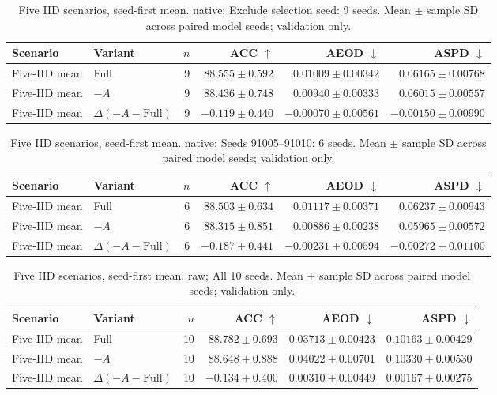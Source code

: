 \begin{table}[t]
\centering
\small
\caption{Five IID scenarios, seed-first mean. native; Exclude selection seed: 9 seeds. Mean $\pm$ sample SD across paired model seeds; validation only.}
\begin{tabular}{llrrrr}
\toprule
Scenario & Variant & $n$ & ACC $\uparrow$ & AEOD $\downarrow$ & ASPD $\downarrow$ \\
\midrule
Five-IID mean & Full & 9 & $88.555 \pm 0.592$ & $0.01009 \pm 0.00342$ & $0.06165 \pm 0.00768$ \\
Five-IID mean & $-A$ & 9 & $88.436 \pm 0.748$ & $0.00940 \pm 0.00333$ & $0.06015 \pm 0.00557$ \\
Five-IID mean & $\Delta(-A-\mathrm{Full})$ & 9 & $-0.119 \pm 0.440$ & $-0.00070 \pm 0.00561$ & $-0.00150 \pm 0.00990$ \\
\bottomrule
\end{tabular}
\end{table}

\begin{table}[t]
\centering
\small
\caption{Five IID scenarios, seed-first mean. native; Seeds 91005–91010: 6 seeds. Mean $\pm$ sample SD across paired model seeds; validation only.}
\begin{tabular}{llrrrr}
\toprule
Scenario & Variant & $n$ & ACC $\uparrow$ & AEOD $\downarrow$ & ASPD $\downarrow$ \\
\midrule
Five-IID mean & Full & 6 & $88.503 \pm 0.634$ & $0.01117 \pm 0.00371$ & $0.06237 \pm 0.00943$ \\
Five-IID mean & $-A$ & 6 & $88.315 \pm 0.851$ & $0.00886 \pm 0.00238$ & $0.05965 \pm 0.00572$ \\
Five-IID mean & $\Delta(-A-\mathrm{Full})$ & 6 & $-0.187 \pm 0.441$ & $-0.00231 \pm 0.00594$ & $-0.00272 \pm 0.01100$ \\
\bottomrule
\end{tabular}
\end{table}

\begin{table}[t]
\centering
\small
\caption{Five IID scenarios, seed-first mean. raw; All 10 seeds. Mean $\pm$ sample SD across paired model seeds; validation only.}
\begin{tabular}{llrrrr}
\toprule
Scenario & Variant & $n$ & ACC $\uparrow$ & AEOD $\downarrow$ & ASPD $\downarrow$ \\
\midrule
Five-IID mean & Full & 10 & $88.782 \pm 0.693$ & $0.03713 \pm 0.00423$ & $0.10163 \pm 0.00429$ \\
Five-IID mean & $-A$ & 10 & $88.648 \pm 0.888$ & $0.04022 \pm 0.00701$ & $0.10330 \pm 0.00530$ \\
Five-IID mean & $\Delta(-A-\mathrm{Full})$ & 10 & $-0.134 \pm 0.400$ & $0.00310 \pm 0.00449$ & $0.00167 \pm 0.00275$ \\
\bottomrule
\end{tabular}
\end{table}

